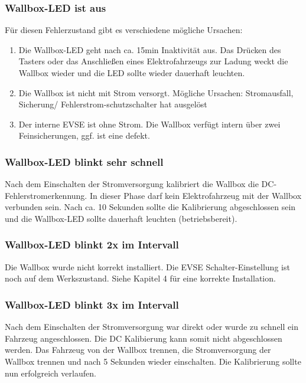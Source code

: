 \documentclass[a4paper,10pt]{article}
\begin{document}
\begin{multicols*}{2}
	\subsubsection*{Wallbox-LED ist aus}
	Für diesen Fehlerzustand gibt es verschiedene mögliche Ursachen:
	\begin{enumerate}
		\item Die Wallbox-LED geht nach ca. 15min Inaktivität aus. Das Drücken des Tasters
		      oder das Anschließen eines Elektrofahrzeugs zur Ladung weckt die Wallbox wieder
		      und die LED sollte wieder dauerhaft leuchten.
		\item Die Wallbox ist nicht mit Strom versorgt. Mögliche Ursachen: Stromausfall,
		      Sicherung/ Fehlerstrom-schutzschalter hat ausgelöst
		\item Der interne EVSE ist ohne Strom. Die Wallbox verfügt intern über zwei
		      Feinsicherungen, ggf. ist eine defekt.
	\end{enumerate}

	\subsubsection*{Wallbox-LED blinkt sehr schnell}
	Nach dem Einschalten der Stromversorgung kalibriert die Wallbox die
	DC-Fehlerstromerkennung. In dieser Phase darf kein Elektrofahrzeug mit der
	Wallbox verbunden sein. Nach ca. 10 Sekunden sollte die Kalibrierung
	abgeschlossen sein und die Wallbox-LED sollte dauerhaft leuchten
	(betriebsbereit).

	\subsubsection*{Wallbox-LED blinkt 2x im Intervall}
	Die Wallbox wurde nicht korrekt installiert. Die EVSE Schalter-Einstellung ist
	noch auf dem Werkszustand. Siehe Kapitel 4 für eine korrekte Installation.

	\subsubsection*{Wallbox-LED blinkt 3x im Intervall}
	Nach dem Einschalten der Stromversorgung war direkt oder wurde zu schnell ein
	Fahrzeug angeschlossen. Die DC Kalibierung kann somit nicht abgeschlossen
	werden. Das Fahrzeug von der Wallbox trennen, die Stromversorgung der Wallbox
	trennen und nach 5 Sekunden wieder einschalten. Die Kalibrierung sollte nun
	erfolgreich verlaufen.


\end{multicols*}
\end{document}
